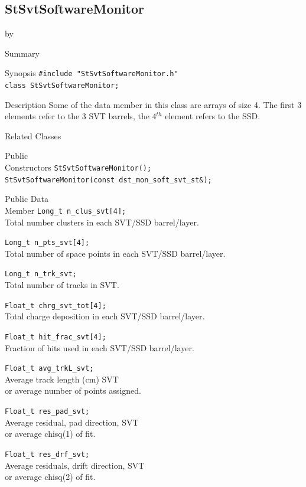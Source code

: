 \documentclass[twoside]{article}
\newcommand{\entrylabel}[1]{\mbox{\textbf{{#1}}}\hfil}%
\newenvironment{entry}
{\begin{list}{}%
    {\renewcommand{\makelabel}{\entrylabel}%
     \setlength{\labelwidth}{90pt}%
     \setlength{\leftmargin}{\labelwidth}
     \advance\leftmargin by \labelsep%
      }%
    }%
  {\end{list}}
\newcommand{\Entrylabel}[1]%
{\raisebox{0pt}[1ex][0pt]{\makebox[\labelwidth][l]%
    {\parbox[t]{\labelwidth}{\hspace{0pt}\textbf{{#1}}}}}}
\newenvironment{Entry}%
{\renewcommand{\entrylabel}{\Entrylabel}\begin{entry}}%
  {\end{entry}}
\begin{document}
\subsection{StSvtSoftwareMonitor}
\label{sec:StSvtSoftwareMonitor}
\begin{Entry}
\item[Summary]
\item[Synopsis]
    \verb+#include "StSvtSoftwareMonitor.h"+\\
    \verb+class StSvtSoftwareMonitor;+\\
\item[Description]
    Some of the data member in this class are arrays of size 4.
    The first 3 elements refer to the 3 SVT barrels, the 4$^{th}$ element
    refers to the SSD.
\item[Related Classes]
\item[Public\\ Constructors]
    \verb+StSvtSoftwareMonitor();+\\
    \verb+StSvtSoftwareMonitor(const dst_mon_soft_svt_st&);+\\
\item[Public Data\\ Member]
    \verb+Long_t n_clus_svt[4];+\\
    Total number clusters in each SVT/SSD barrel/layer. 
    
    \verb+Long_t n_pts_svt[4];+\\
    Total number of space points in each SVT/SSD barrel/layer. 
    
    \verb+Long_t n_trk_svt;+\\
    Total number of tracks in SVT.
    
    \verb+Float_t chrg_svt_tot[4];+\\
    Total charge deposition in each SVT/SSD barrel/layer. 
    
    \verb+Float_t hit_frac_svt[4];+\\
    Fraction of hits used in each SVT/SSD barrel/layer. 
    
    \verb+Float_t avg_trkL_svt;+\\
    Average track length (cm) SVT \\
    or average number of points assigned.
    
    \verb+Float_t res_pad_svt;+\\
    Average residual, pad direction, SVT \\
    or average chisq(1) of fit.

    \verb+Float_t res_drf_svt;+\\
    Average residuals, drift direction, SVT \\
    or average chisq(2) of fit.
\end{Entry}
\clearpage
\end{document}
